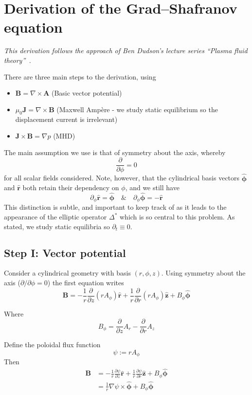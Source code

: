 \documentclass[11pt,a4paper]{article}
\begin{document}
\appendix
\section{Derivation of the Grad--Shafranov equation}\label{app:derivation}
\emph{This derivation follows the approach of Ben Dudson's lecture series ``Plasma fluid theory''~\cite{dudson}.} 

There are three main steps to the derivation, using 
\begin{itemize}
    \item $\mathbf{B}=\nabla \times \mathbf{A}$ (Basic vector potential)
    \item $\mu_0\mathbf{\mathbf{J}}=\nabla \times \mathbf{B}$ (Maxwell Ampère - we study static equilibrium so the displacement current is irrelevant)
    \item $\mathbf{J} \times\mathbf{B}=\nabla p$ (MHD)
\end{itemize}
The main assumption we use is that of symmetry about the axis, whereby 
$$\frac{\partial}{\partial\phi}=0$$
for all scalar fields considered. Note, however, that the cylindrical basis vectors $\hat{\boldsymbol{\phi}}$ and $\mathbf{\hat{r}}$ both retain their dependency on $\phi$, and we still have 
$$\partial_\phi\mathbf{\hat{r}}=\hat{\boldsymbol{\phi}} \quad \& \quad\partial_\phi\hat{\boldsymbol{\phi}}=-\mathbf{\hat{r}}$$
This distinction is subtle, and important to keep track of as it leads to the appearance of the elliptic operator $\Delta^*$ which is so central to this problem. As stated, we study static equilibria so $\partial_t\equiv 0$.

\subsection{Step I: Vector potential}
    Consider a cylindrical geometry with basis $(r, \phi,z)$. Using symmetry about the axis ($\partial/\partial\phi =0$) the first equation writes
    $$\mathbf{B}=-\frac{1}{r}\frac{\partial}{\partial z}(rA_{\phi})\hat{\mathbf{r}}+\frac{1}{r}\frac{\partial}{\partial r}(rA_{\phi})\hat{\mathbf{z}}+B_\phi \hat{\boldsymbol{\phi}}$$
    
    Where 
    $$B_\phi =\frac{\partial}{\partial z}A_r-\frac{\partial}{\partial r}A_z$$
    
    Define the poloidal flux function
    $$\psi:=rA_\phi$$
    Then 
    $$\begin{aligned}
        \mathbf{B}&=-\frac{1}{r}\frac{\partial\psi}{\partial z}\hat{\mathbf{r}}+\frac{1}{r}\frac{\partial \psi}{\partial r}\hat{\mathbf{z}}+B_\phi \hat{\boldsymbol{\phi}}\\
        &=\boxed{\frac{1}{r} \nabla\psi\times\hat{\boldsymbol{\phi}}+B_\phi \hat{\boldsymbol{\phi}}}
    \end{aligned}
    $$
\end{document}
